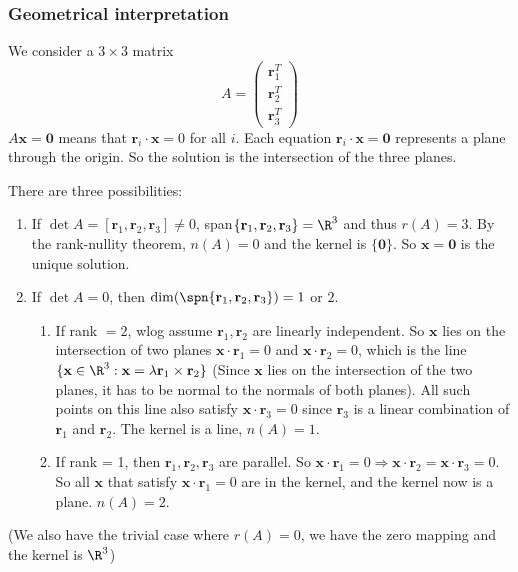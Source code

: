 \documentclass[a4paper]{article}
\begin{document}
\subsubsection{Geometrical interpretation}
We consider a $3\times 3$ matrix
\[
  A = \begin{pmatrix} \mathbf{r}_1^T\\\mathbf{r}_2^T\\\mathbf{r}_3^T\end{pmatrix}
\]
$A\mathbf{x} = \mathbf{0}$ means that $\mathbf{r}_i\cdot \mathbf{x} = 0$ for all $i$. Each equation $\mathbf{r}_i\cdot \mathbf{x} = \mathbf{0}$ represents a plane through the origin. So the solution is the intersection of the three planes.

There are three possibilities:
\begin{enumerate}
  \item If $\det A =[\mathbf{r}_1, \mathbf{r}_2, \mathbf{r}_3] \not= 0$, span$\{\mathbf{r}_1, \mathbf{r}_2, \mathbf{r}_3\} = \R^3$ and thus $r(A) = 3$. By the rank-nullity theorem, $n(A) = 0$ and the kernel is $\{\mathbf{0}\}$. So $\mathbf{x} = \mathbf{0}$ is the unique solution.
  \item If $\det A = 0$, then  $\dim(\spn\{\mathbf{r}_1, \mathbf{r}_2, \mathbf{r}_3\}) = 1$ or $2$.
    \begin{enumerate}
      \item If rank $= 2$, wlog assume $\mathbf{r}_1, \mathbf{r}_2$ are linearly independent. So $\mathbf{x}$ lies on the intersection of two planes $\mathbf{x}\cdot \mathbf{r}_1 = 0$ and $\mathbf{x}\cdot \mathbf{r}_2 = 0$, which is the line $\{\mathbf{x}\in \R^3: \mathbf{x} = \lambda \mathbf{r}_1\times \mathbf{r}_2\}$ (Since $\mathbf{x}$ lies on the intersection of the two planes, it has to be normal to the normals of both planes). All such points on this line also satisfy $\mathbf{x}\cdot\mathbf{r}_3 = 0$ since $\mathbf{r}_3$ is a linear combination of $\mathbf{r}_1$ and $\mathbf{r}_2$. The kernel is a line, $n(A) = 1$.
      \item If rank = 1, then $\mathbf{r}_1, \mathbf{r}_2, \mathbf{r}_3$ are parallel. So $\mathbf{x}\cdot \mathbf{r}_1 = 0 \Rightarrow \mathbf{x}\cdot \mathbf{r}_2 = \mathbf{x}\cdot \mathbf{r}_3 = 0$. So all $\mathbf{x}$ that satisfy $\mathbf{x}\cdot \mathbf{r}_1 = 0$ are in the kernel, and the kernel now is a plane. $n(A) = 2$.
    \end{enumerate}
\end{enumerate}
(We also have the trivial case where $r(A) = 0$, we have the zero mapping and the kernel is $\R^3$)
\end{document}
